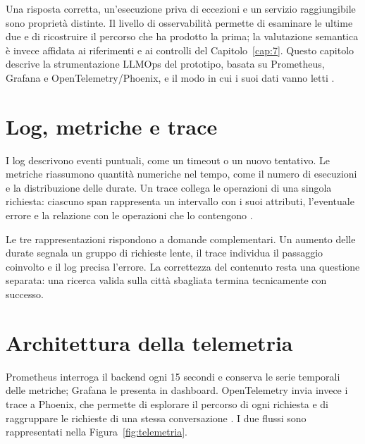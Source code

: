 Una risposta corretta, un'esecuzione priva di eccezioni e un servizio
raggiungibile sono proprietà distinte. Il livello di osservabilità permette di
esaminare le ultime due e di ricostruire il percorso che ha prodotto la prima;
la valutazione semantica è invece affidata ai riferimenti e ai controlli del
Capitolo~\ref{cap:7}. Questo capitolo descrive la strumentazione LLMOps del
prototipo, basata su Prometheus, Grafana e OpenTelemetry/Phoenix, e il modo in
cui i suoi dati vanno letti \cite{guidaProgetto2026}.

\section{Log, metriche e trace}

I log descrivono eventi puntuali, come un timeout o un nuovo tentativo. Le
metriche riassumono quantità numeriche nel tempo, come il numero di esecuzioni
e la distribuzione delle durate. Un trace collega le operazioni di una singola
richiesta: ciascuno span rappresenta un intervallo con i suoi attributi,
l'eventuale errore e la relazione con le operazioni che lo contengono
\cite{otelTraces}.

Le tre rappresentazioni rispondono a domande complementari. Un aumento delle
durate segnala un gruppo di richieste lente, il trace individua il passaggio
coinvolto e il log precisa l'errore. La correttezza del contenuto resta una
questione separata: una ricerca valida sulla città sbagliata termina
tecnicamente con successo.

\section{Architettura della telemetria}

Prometheus interroga il backend ogni 15 secondi e conserva le serie temporali
delle metriche; Grafana le presenta in dashboard. OpenTelemetry invia invece i
trace a Phoenix, che permette di esplorare il percorso di ogni richiesta e di
raggruppare le richieste di una stessa conversazione \cite{phoenixTracing}.
I due flussi sono rappresentati nella Figura~\ref{fig:telemetria}.

